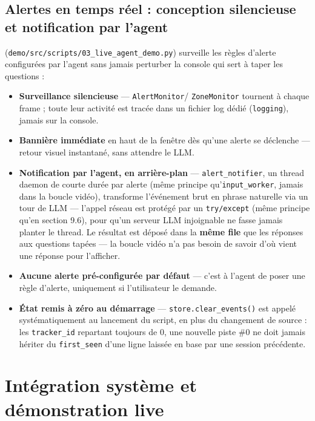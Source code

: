 \documentclass[11pt,a4paper]{article}
\let\Oldsubsection\subsection
\renewcommand{\subsection}{\FloatBarrier\Oldsubsection}
\begin{document}
    \subsection{Alertes en temps réel : conception silencieuse et
    notification par l'agent}
    \label{sec:agent-d3}
    
    (\texttt{demo/src/scripts/03\_live\_agent\_demo.py}) surveille les règles
    d'alerte configurées par l'agent sans jamais perturber la console qui
    sert à taper les questions :
    
    \begin{itemize}[leftmargin=1.5em]
      \item \textbf{Surveillance silencieuse} --- \texttt{AlertMonitor}/
        \texttt{ZoneMonitor} tournent à chaque frame ; toute leur activité
        est tracée dans un fichier log dédié (\texttt{logging}), jamais sur
        la console.
      \item \textbf{Bannière immédiate} en haut de la fenêtre dès qu'une
        alerte se déclenche --- retour visuel instantané, sans attendre le
        LLM.
      \item \textbf{Notification par l'agent, en arrière-plan} ---
        \texttt{alert\_notifier}, un thread daemon de courte durée par
        alerte (même principe qu'\texttt{input\_worker}, jamais dans la
        boucle vidéo), transforme l'événement brut en phrase naturelle via
        un tour de LLM --- l'appel réseau est protégé par un
        \texttt{try/except} (même principe qu'en section 9.6), pour qu'un
        serveur LLM injoignable ne fasse jamais planter le thread. Le
        résultat est déposé dans la \textbf{même file} que les réponses aux
        questions tapées --- la boucle vidéo n'a pas besoin de savoir d'où
        vient une réponse pour l'afficher.
      \item \textbf{Aucune alerte pré-configurée par défaut} --- c'est à
        l'agent de poser une règle d'alerte, uniquement si l'utilisateur le
        demande.
      \item \textbf{État remis à zéro au démarrage} ---
        \texttt{store.clear\_events()} est appelé systématiquement au
        lancement du script, en plus du changement de source : les
        \texttt{tracker\_id} repartant toujours de 0, une nouvelle piste
        \#0 ne doit jamais hériter du \texttt{first\_seen} d'une ligne
        laissée en base par une session précédente.
    \end{itemize}
    
    
    \section{Intégration système et démonstration live}
    
\end{document}
